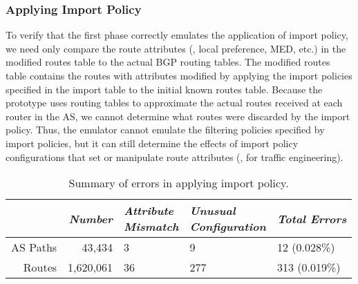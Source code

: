 \subsubsection{Applying Import Policy}
To verify that the first phase correctly emulates the application of
import policy, we need only compare the route attributes (\ie, local
preference, MED, etc.) in the {\dfc modified routes} table to the
actual BGP routing tables.  The {\dfc modified routes} table contains
the routes with attributes modified by applying the import policies
specified in the {\mf import} table to the initial {\mf known routes}
table.  Because the prototype uses routing tables to approximate the
actual routes received at each router in the AS, we cannot
determine what routes were discarded by the import policy.  Thus, the
emulator cannot emulate the filtering policies specified by import
policies, but it can still determine the
effects of import policy configurations that set or manipulate 
route attributes (\eg, for traffic engineering).
%

\begin{table}
\begin{center}
{\small
\begin{tabular}{r|r|p{0.825in}p{0.825in}|l}
& {\em Number} & \parbox{0.825in}{{\em Attribute \\ Mismatch}} &
  \parbox{0.825in}{{\em Unusual\\ Configuration}} & {\em Total Errors}
  \\ \hline 
AS Paths & 43,434 & 3 & 9 & 12 (0.028\%) \\ %
Routes & 1,620,061 & 36 & 277 & 313 (0.019\%) \\ %
\end{tabular}
\vspace{-0.15in}
}
\end{center}
\caption{Summary of errors in applying import policy.  
}
\label{tab:mismatch_summary}
\end{table}


